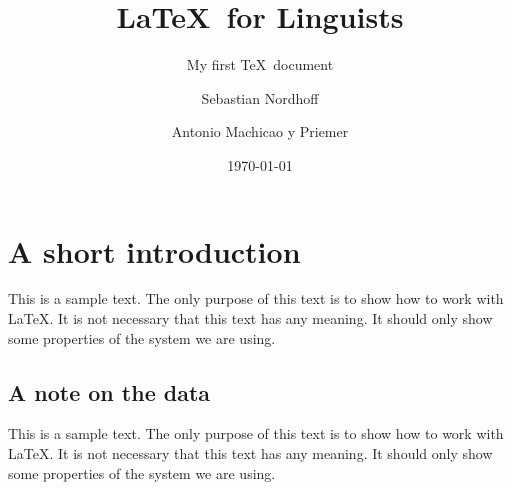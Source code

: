 \documentclass[10pt, paper=a4, abstracton]{scrartcl}
\author{Sebastian Nordhoff \and Antonio Machicao y Priemer}
\title{\LaTeX\ for Linguists}
\subtitle{My first \TeX\ document}
\date{\today}
\begin{document}
\maketitle

\tableofcontents


\section[Introduction]{A short introduction}

This is a sample text. The only purpose of this text is to show how to work with \LaTeX . It is not necessary that this text has any meaning. It should only show some properties of the system we are using.


\subsection{A note on the data}

This is a sample text. The only purpose of this text is to show how to work with \LaTeX . It is not necessary that this text has any meaning. It should only show some properties of the system we are using.
\end{document}

